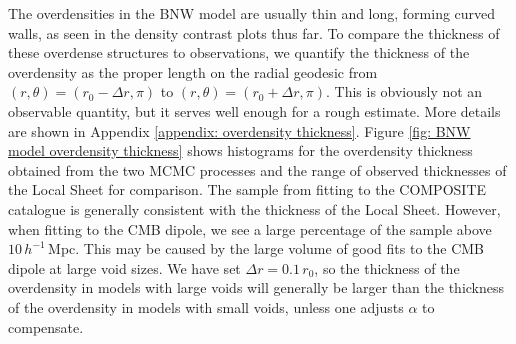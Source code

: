 \documentclass[a4paper,12pt]{report}
\begin{document}
The overdensities in the BNW model are usually thin and long, forming curved walls, as seen in the density contrast plots thus far. To compare the thickness of these overdense structures to observations, we quantify the thickness of the overdensity as the proper length on the radial geodesic from $(r,\theta)=(r_0-\Delta r, \pi)$ to $(r, \theta)=(r_0+\Delta r, \pi)$. This is obviously not an observable quantity, but it serves well enough for a rough estimate. More details are shown in Appendix \ref{appendix: overdensity thickness}. Figure \ref{fig: BNW model overdensity thickness} shows histograms for the overdensity thickness obtained from the two MCMC processes and the range of observed thicknesses of the Local Sheet for comparison. The sample from fitting to the COMPOSITE catalogue is generally consistent with the thickness of the Local Sheet. However, when fitting to the CMB dipole, we see a large percentage of the sample above $10\, h^{-1}\,$Mpc. This may be caused by the large volume of good fits to the CMB dipole at large void sizes. We have set $\Delta r = 0.1\,r_0$, so the thickness of the overdensity in models with large voids will generally be larger than the thickness of the overdensity in models with small voids, unless one adjusts $\alpha$ to compensate.
\end{document}
